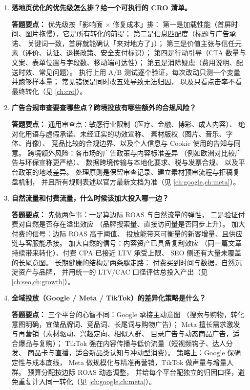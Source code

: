 \begin{interview}[题库与答题要点]
\begin{enumerate}[label=]
  \item[\textcolor{VioletDeep}{\textbf{Q98.}}] \textbf{落地页优化的优先级怎么排？给一个可执行的 CRO 清单。}
\par\smallskip\noindent\textcolor{VioletDeep}{\textbf{答题要点：}}
优先级按「影响面 $\times$ 修复成本」排：
第一是加载性能（首屏时间、图片拖慢），它是所有转化的前提；
第二是信息匹配度（标题与广告承诺、
关键词一致，首屏就能确认「来对地方了」）；
第三是价值主张与信任元素（评价、认证、退换政策、安全支付标识）；
第四是行动引导（CTA 数量与文案、表单位置与字段数、移动端可达性）；
第五是消除疑虑（费用说明、配送时效、常见问题）。
执行上用 A/B 测试逐个验证，每次改动只测一个变量并跑够样本量；
常见错误是同时改五处导致无法归因，
以及只看点击率不看最终转化（见 \cref{ch:cro}）。

  \item[\textcolor{VioletDeep}{\textbf{Q99.}}] \textbf{广告合规审查要查哪些点？跨境投放有哪些额外的合规风险？}
\par\smallskip\noindent\textcolor{VioletDeep}{\textbf{答题要点：}}
通用审查点：敏感行业限制（医疗、金融、博彩、成人内容）、
绝对化用语与虚假承诺、未经证实的功效宣称、
素材版权（图片、音乐、字体、肖像）、
竞品比较的合规边界、以及个人信息与 Cookie 使用的告知与同意。
跨境额外风险：各市场的广告政策与内容标准差异
（例如欧洲对比较广告与环保宣称更严格）、
数据跨境传输与本地化要求、税与发票合规、
以及平台政策的地域差异。
处理原则是保留审查记录、建立素材预审流程与拒稿复盘机制，
并且所有规则表述以官方最新文档为准（见 \cref{ch:google,ch:meta}）。

  \item[\textcolor{VioletDeep}{\textbf{Q100.}}] \textbf{自然流量和付费流量，什么时候该加大投入哪一边？}
\par\smallskip\noindent\textcolor{VioletDeep}{\textbf{答题要点：}}
先做两件事：一是算边际 ROAS 与自然流量的弹性，
二是验证付费对自然是否存在溢出效应
（品牌搜索量、直接访问量是否同步上升）。
加大付费的信号：边际 ROAS 高于阈值、
投放能带来可衡量的新客增量、且供应链与客服能承接。
加大自然的信号：内容资产已具备复利效应
（同一篇文章持续带来转化）、付费 CPA 已接近 LTV 承受上限、
SEO 侧还有大量未覆盖的长尾意图。
长期健康的结构是两条腿走路：
付费买到时间与数据，自然沉淀资产与品牌，
并用统一的 LTV/CAC 口径评估总投入产出（见 \cref{ch:seo,ch:growth}）。

  \item[\textcolor{VioletDeep}{\textbf{Q101.}}] \textbf{全域投放（Google / Meta / TikTok）的差异化策略是什么？}
\par\smallskip\noindent\textcolor{VioletDeep}{\textbf{答题要点：}}
三个平台的心智不同：Google 承接主动意图
（搜索与购物，转化意图明确，宜做品牌词、竞品词、长尾词与购物广告）；
Meta 擅长需求激发与再营销（素材驱动、兴趣定向、相似人群、
目录广告与动态商品广告，适合爆品与复购）；
TikTok 强在内容传播与低价流量（短视频钩子、达人分发、
商品卡与直播，适合新品类认知与冲动型消费）。
策略上：Google 保确定性与成本底线，
Meta 做规模化与精准再营销，TikTok 做声量与增量人群。
预算分配按边际 ROAS 动态调整，
并给每个平台配独立的归因口径，避免重复计入同一转化（见 \cref{ch:google,ch:meta}）。


\end{enumerate}
\end{interview}
